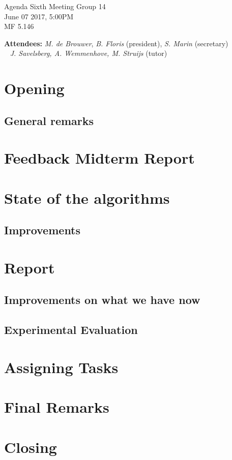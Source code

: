 \documentclass[a4paper,twoside,11pt]{article}
\title{}
\date{}
\begin{document}

\begin{center}
\Huge{Agenda Sixth Meeting Group 14}
\\\vspace*{2mm}
\Large{June 07 2017, 5:00PM}
\\\vspace*{2mm}
\large{MF 5.146}
\\
		\end{center}

		\textbf{Attendees:} \textit{M. de Brouwer},
                \textit{B. Floris} (president), \textit{S. Marin} (secretary)
\\\indent\qquad\,\,\,\,\,\qquad\quad \textit{J. Savelsberg, A. Wemmenhove, M. Struijs} (tutor)

	\section{Opening}
	\subsection{General remarks}

        \section{Feedback Midterm Report}

        \section{State of the algorithms}
        \subsection{Improvements}

        \section{Report}
        \subsection{Improvements on what we have now}
        \subsection{Experimental Evaluation}

        \section{Assigning Tasks}

	\section{Final Remarks}

	\section{Closing}

	
\end{document}
